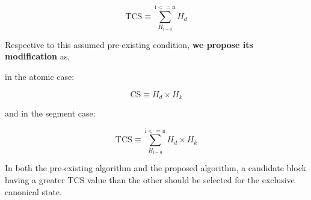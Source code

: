 \documentclass[11pt]{article}
\theoremstyle{plain}
\begin{document}
\begin{equation}
\mathrm{TCS} \equiv \sum_{H_\mathrm{i = 0}}^{\mathrm{i <= n}} H_d
\end{equation}

Respective to this assumed pre-existing condition, \textbf{we propose its modification} as,

in the atomic case:

\begin{equation}
\mathrm{CS} \equiv H_d \times H_k
\end{equation}

and in the segment case:

\begin{equation}
\mathrm{TCS} \equiv \sum_{H_\mathrm{i = 0}}^{\mathrm{i <= n}} H_d \times H_k
\end{equation}

In both the pre-existing algorithm and the proposed algorithm, a candidate
block having a greater $\mathrm{TCS}$ value than the other should be selected for
the exclusive canonical state.
\end{document}
